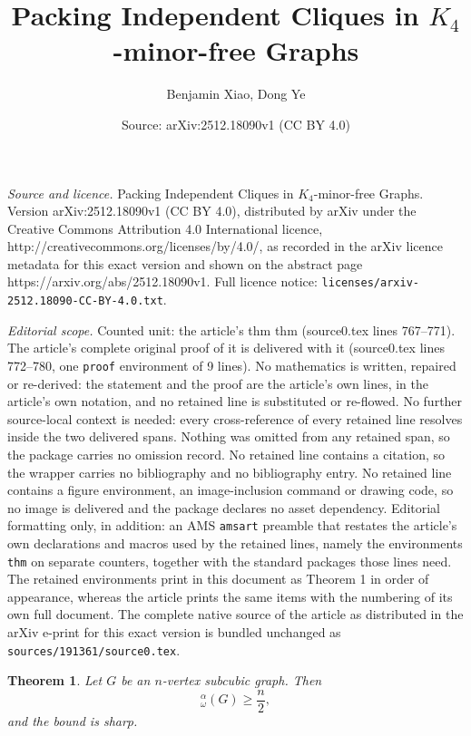 \documentclass[10pt,a4paper]{amsart}
\title{Packing Independent Cliques in $K_4$-minor-free Graphs}
\author{Benjamin Xiao, Dong Ye}
\date{Source: arXiv:2512.18090v1 (CC BY 4.0)}
\newtheorem{thm}{Theorem}
\newcommand{\idq}{{}^{\alpha}_{\omega}}
\begin{document}
\maketitle

\noindent\emph{Source and licence.} Packing Independent Cliques in $K_4$-minor-free Graphs. Version arXiv:2512.18090v1 (CC BY 4.0), distributed by arXiv under the Creative Commons Attribution 4.0 International licence, http://creativecommons.org/licenses/by/4.0/, as recorded in the arXiv licence metadata for this exact version and shown on the abstract page https://arxiv.org/abs/2512.18090v1. Full licence notice: \texttt{licenses/arxiv-2512.18090-CC-BY-4.0.txt}.\par\smallskip

\noindent\textit{Editorial scope.} Counted unit: the article's thm thm (source0.tex lines 767--771). The article's complete original proof of it is delivered with it (source0.tex lines 772--780, one \texttt{proof} environment of 9 lines). No mathematics is written, repaired or re-derived: the statement and the proof are the article's own lines, in the article's own notation, and no retained line is substituted or re-flowed.  No further source-local context is needed: every cross-reference of every retained line resolves inside the two delivered spans.  Nothing was omitted from any retained span, so the package carries no omission record.  No retained line contains a citation, so the wrapper carries no bibliography and no bibliography entry.  No retained line contains a figure environment, an image-inclusion command or drawing code, so no image is delivered and the package declares no asset dependency.  Editorial formatting only, in addition: an AMS \texttt{amsart} preamble that restates the article's own declarations and macros used by the retained lines, namely the environments \texttt{thm} on separate counters, together with the standard packages those lines need.  The retained environments print in this document as Theorem 1 in order of appearance, whereas the article prints the same items with the numbering of its own full document.  The complete native source of the article as distributed in the arXiv e-print for this exact version is bundled unchanged as \texttt{sources/191361/source0.tex}.
\begin{thm}
Let $G$ be an $n$-vertex subcubic graph. Then 
\[\idq(G)\ge \frac n 2,\]
and the bound is sharp. 
\end{thm}
\end{document}
